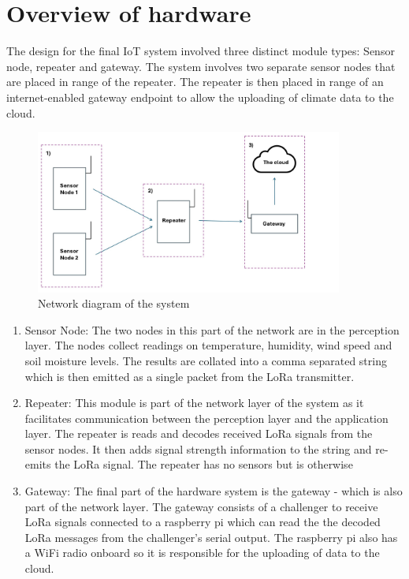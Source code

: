 \section{Overview of hardware}

The design for the final IoT system involved three distinct module types: Sensor
node, repeater and gateway. The system involves two separate sensor nodes that
are placed in range of the repeater. The repeater is then placed in range of an
internet-enabled gateway endpoint to allow the uploading of climate data to the
cloud.

\begin{figure}[H]
    \centering
    \includegraphics[width=0.9\textwidth]{contents/part-2/fig2/network-diagram.jpg}
    \caption{Network diagram of the system}
    \label{fig:network-diagram}
\end{figure}

\begin{enumerate}
    \item Sensor Node: The two nodes in this part of the network are in the
          perception layer. The nodes collect readings on temperature, humidity,
          wind speed and soil moisture levels. The results are collated into a
          comma separated string which is then emitted as a single packet from
          the LoRa transmitter.
    \item Repeater: This module is part of the network layer of the system as it
          facilitates communication between the perception layer and the
          application layer. The repeater is reads and decodes received LoRa
          signals from the sensor nodes. It then adds signal strength
          information to the string and re-emits the LoRa signal. The repeater
          has no sensors but is otherwise
    \item Gateway: The final part of the hardware system is the gateway - which
          is also part of the network layer. The gateway consists of a
          challenger to receive LoRa signals connected to a raspberry pi which
          can read the the decoded LoRa messages from the challenger's serial
          output. The raspberry pi also has a WiFi radio onboard so it is
          responsible for the uploading of data to the cloud.
\end{enumerate}



